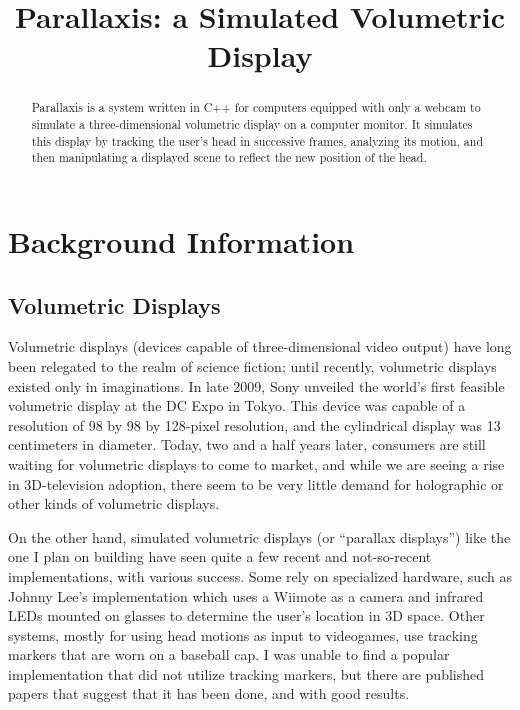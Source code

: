 
\title{Parallaxis: a Simulated Volumetric Display}


\maketitle

\begin{abstract}
  Parallaxis is a system written in C++ for computers equipped with
  only a webcam to simulate a three-dimensional volumetric display on
  a computer monitor. It simulates this display by tracking the user's
  head in successive frames, analyzing its motion, and then
  manipulating a displayed scene to reflect the new position of the
  head.
\end{abstract}

\tableofcontents
\newpage

\section{Background Information}
\subsection{Volumetric Displays}
Volumetric displays (devices capable of three-dimensional video
output) have long been relegated to the realm of science fiction;
until recently, volumetric displays existed only in imaginations. In
late 2009, Sony unveiled the world's first feasible volumetric display
at the DC Expo in Tokyo. This device was capable
of a resolution of 98 by 98 by 128-pixel resolution, and the
cylindrical display was 13 centimeters in diameter. Today, two and a
half years later, consumers are still waiting for volumetric displays
to come to market, and while we are seeing a rise in 3D-television
adoption, there seem to be very little demand for holographic or other
kinds of volumetric displays.

On the other hand, simulated volumetric displays (or ``parallax
displays'') like the one I plan on building have seen quite a few
recent and not-so-recent implementations, with various success. Some
rely on specialized hardware, such as Johnny Lee's implementation
which uses a Wiimote as a camera and infrared LEDs mounted on glasses
to determine the user's location in 3D space. Other
systems, mostly for using head motions as input to videogames, use
tracking markers that are worn on a baseball cap. I was unable to find
a popular implementation that did not utilize tracking markers, but
there are published papers that suggest that it has been done, and
with good results. 

